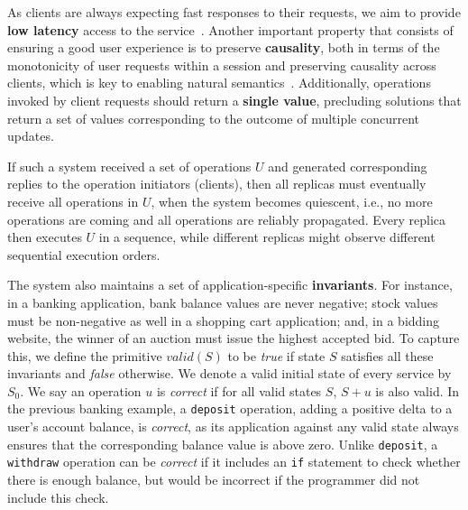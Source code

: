As clients are always expecting fast responses to their requests, 
we aim to provide {\bf low latency} access to the service~\cite{Schurman2009latency}. 
Another important property that consists of ensuring a good user
experience is to preserve \textbf{causality}, both in terms of the monotonicity of user requests
within a session and preserving causality across clients, which is key
to enabling natural semantics~\cite{Petersen1997Flexible}. Additionally,
operations invoked by client requests should return a {\bf single value}, precluding solutions that return a set of values
corresponding to the outcome of multiple concurrent updates.

If such a system received
a set of operations $U$ and generated corresponding replies to the operation initiators (clients),
then all replicas must eventually receive all operations in $U$, when the system becomes
quiescent, i.e., no more operations are coming and all operations are reliably propagated.
Every replica then executes $U$ in a sequence, while different replicas might observe
different sequential execution orders.
\fi

The system also maintains a set of application-specific
{\bf invariants}. For instance, in a banking application,
bank balance values are never negative; stock values must be non-negative as well in a shopping
cart application; and, in a bidding website, the winner of an auction must issue
the highest accepted bid. To capture this, we define the primitive $\textit{valid}(S)$ to be {\it
  true} if state $S$ satisfies all these invariants and {\it false}
otherwise. We denote a valid initial state of every service by $S_0$. We say an operation $u$ is {\it correct} if for
all valid states $S$, $S + u$ is also valid. In the previous banking example,
a {\tt deposit} operation, adding a positive delta to a user's account balance,
is {\it correct}, as its application against any valid state always
ensures that the corresponding balance value is above zero. Unlike
{\tt deposit}, a {\tt withdraw} operation can be {\it correct} if it includes
an {\tt if} statement to check whether there is enough balance,
 but would be incorrect if the programmer did not include this check.





